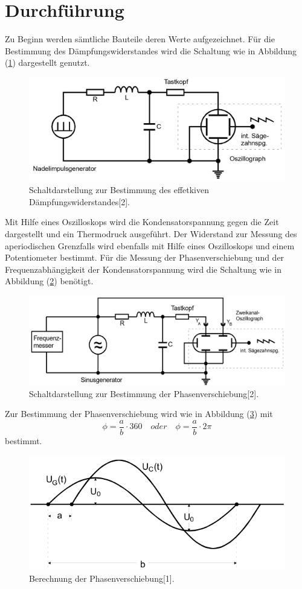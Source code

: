 \section{Durchführung}
Zu Beginn werden sämtliche Bauteile deren Werte aufgezeichnet.
Für die Bestimmung des Dämpfungswiderstandes wird die Schaltung wie in Abbildung (\ref{fig:3}) dargestellt genutzt.
\begin{figure}[H]
\centering
\includegraphics[width=\textwidth]{Schaltung1.png}
\caption{Schaltdarstellung zur Bestimmung des effetkiven Dämpfungswiderstandes[2].}
\label{fig:3}
\end{figure}
Mit Hilfe eines Oszilloskops wird die Kondensatorspannung gegen die Zeit dargestellt und ein Thermodruck ausgeführt.
Der Widerstand zur Messung des aperiodischen Grenzfalls wird ebenfalls mit Hilfe eines Oszilloskops und einem Potentiometer bestimmt.
Für die Messung der Phasenverschiebung und der Frequenzabhängigkeit der Kondensatorspannung wird die Schaltung wie in Abbildung (\ref{fig:4}) benötigt.
\begin{figure}[H]
\centering
\includegraphics[width=\textwidth]{Schaltung2.png}
\caption{Schaltdarstellung zur Bestimmung der Phasenverschiebung[2].}
\label{fig:4}
\end{figure}
Zur Bestimmung der Phasenverschiebung wird wie in Abbildung (\ref{fig:5}) mit
 \begin{equation}
   \phi = \frac{a}{b} \cdot 360 \quad oder \quad \phi = \frac{a}{b} \cdot 2\pi
\end{equation}
   bestimmt.
\begin{figure}[H]
\centering
\includegraphics[width=\textwidth]{Phase.png}
\caption{Berechnung der Phasenverschiebung[1].}
\label{fig:5}
\end{figure}
